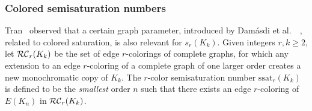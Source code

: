 \documentclass[12pt]{article}
\theoremstyle{definition}
\begin{document}
	\subsubsection{Colored semisaturation numbers}
	
	Tran~\cite{tran2022two} observed that a certain graph parameter, introduced by Dam\'asdi et al.\ ~\cite{damasdi2021saturation}, related to colored saturation, is also relevant for $s_r(K_k)$.
Given integers $r,k \geq 2$, let ${\cal RC}_r(K_k)$ be the set of edge $r$-colorings of complete graphs, for which any extension to an edge $r$-coloring of a complete graph of one larger order creates a new monochromatic copy of $K_k$. The $r$-color semisaturation number $\mathrm{ssat}_r(K_{k})$ is defined to be the {\em smallest} order $n$ such that there exists an edge $r$-coloring of $E(K_n)$ in ${\cal RC}_r(K_k)$. 
\end{document}
